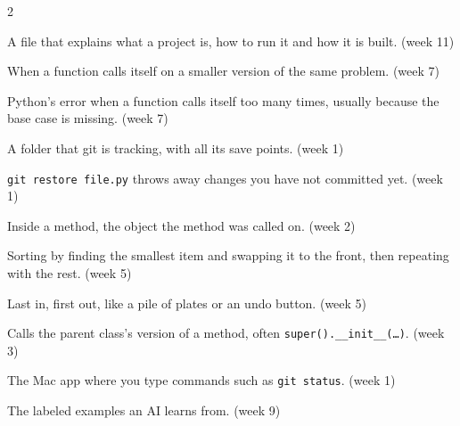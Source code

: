 \documentclass[level=3]{kidscode}
\newcommand{\term}[3]{\item[#1] #2 \textcolor{kcgray}{\small(week #3)}}
\begin{document}
\begin{multicols}{2}
\begin{description}[leftmargin=0pt,itemsep=3pt,font=\bfseries]
\term{README}{A file that explains what a project is, how to run it and how it is built.}{11}
\term{recursion}{When a function calls itself on a smaller version of the same problem.}{7}
\term{RecursionError}{Python's error when a function calls itself too many times, usually because
the base case is missing.}{7}
\term{repository (repo)}{A folder that git is tracking, with all its save points.}{1}
\term{restore}{\texttt{git restore file.py} throws away changes you have not committed yet.}{1}
\term{\texttt{self}}{Inside a method, the object the method was called on.}{2}
\term{selection sort}{Sorting by finding the smallest item and swapping it to the front, then
repeating with the rest.}{5}
\term{stack}{Last in, first out, like a pile of plates or an undo button.}{5}
\term{\texttt{super()}}{Calls the parent class's version of a method, often
\texttt{super().\_\_init\_\_(\ldots)}.}{3}
\term{Terminal}{The Mac app where you type commands such as \texttt{git status}.}{1}
\term{training data}{The labeled examples an AI learns from.}{9}
\end{description}
\end{multicols}
\end{document}
